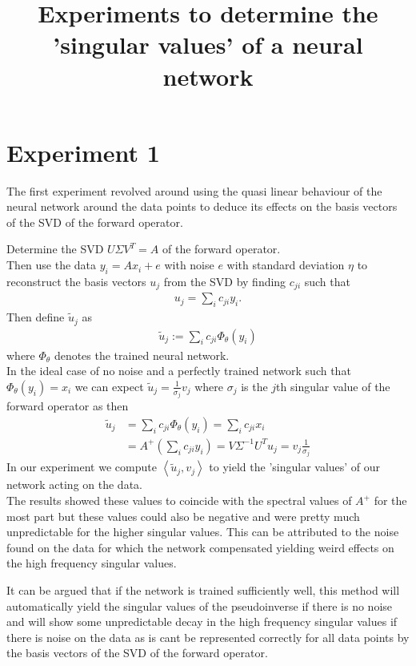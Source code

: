 \documentclass{article}
\title{Experiments to determine the 'singular values' of a neural network}
\date{}
\begin{document}
\maketitle

\section*{Experiment 1}
The first experiment revolved around using the quasi linear behaviour of the neural network around the data points to deduce its effects on the basis vectors of the SVD of the forward operator.\\
\par
Determine the SVD $U\Sigma V^T=A$ of the forward operator.\\
Then use the data $y_i=Ax_i + e$ with noise $e$ with standard deviation $\eta$ to reconstruct the basis vectors $u_j$ from the SVD by finding $c_{ji}$ such that
\begin{align*}
u_j = \sum_i c_{ji} y_i.
\end{align*}
Then define $\tilde{u}_j$ as
\begin{align*}
\tilde{u}_j := \sum_i c_{ji} \Phi_\theta (y_i)
\end{align*}
where $\Phi_\theta$ denotes the trained neural network.\\
In the ideal case of no noise and a perfectly trained network such that $\Phi_\theta(y_i)=x_i$ we can expect $\tilde{u}_j = \frac{1}{\sigma_j} v_j$ where $\sigma_j$ is the $j$th singular value of the forward operator as then
\begin{align*}
\tilde{u}_j &= \sum_i c_{ji} \Phi_\theta(y_i) = \sum_i c_{ji} x_i\\
&= A^+ \left(\sum_i c_{ji} y_i\right) = V\Sigma^{-1} U^T u_j = v_j \frac{1}{\sigma_j}
\end{align*}
In our experiment we compute $\left\langle \tilde{u}_j, v_j \right\rangle$ to yield the 'singular values' of our network acting on the data.\\
The results showed these values to coincide with the spectral values of $A^+$ for the most part but these values could also be negative and were pretty much unpredictable for the higher singular values.
This can be attributed to the noise found on the data for which the network compensated yielding weird effects on the high frequency singular values.\\
\par
It can be argued that if the network is trained sufficiently well, this method will automatically yield the singular values of the pseudoinverse if there is no noise and will show some unpredictable decay in the high frequency singular values if there is noise on the data as is cant be represented correctly for all data points by the basis vectors of the SVD of the forward operator.
\end{document}
